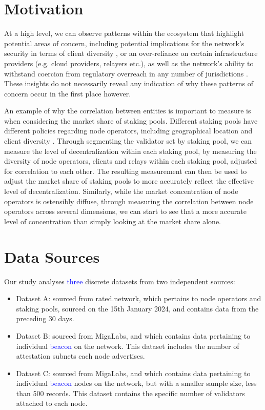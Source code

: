 \documentclass[conference]{IEEEtran}
\newcommand{\leo}[1]{\textcolor{blue}{#1}}
\begin{document}
\section{Motivation}
\label{sec:motivation}

At a high level, we can observe patterns within the ecosystem that highlight potential areas of concern, including potential implications for the network's security in terms of client diversity \cite{clientdiversity2024}, or an over-reliance on certain infrastructure providers (e.g. cloud providers, relayers etc.), as well as the network's ability to withstand coercion from regulatory overreach in any number of jurisdictions \cite{wahrstatter2023}. These insights do not necessarily reveal any indication of why these patterns of concern occur in the first place however.

An example of why the correlation between entities is important to measure is when considering the market share of staking pools. Different staking pools have different policies regarding node operators, including geographical location and client diversity \cite{vanom2024}.  Through segmenting the validator set by staking pool, we can measure the level of decentralization within each staking pool, by measuring the diversity of node operators, clients and relays within each staking pool, adjusted for correlation to each other. The resulting measurement can then be used to adjust the market share of staking pools to more accurately reflect the effective level of decentralization.  Similarly, while the market concentration of node operators is ostensibly diffuse, through measuring the correlation between node operators across several dimensions, we can start to see that a more accurate level of concentration than simply looking at the market share alone.

\section{Data Sources}
\label{sec:data}

Our study analyses \leo{three} discrete datasets from two independent sources:

\begin{itemize}
    \item Dataset A: sourced from rated.network, which pertains to node operators and staking pools, sourced on the 15th January 2024, and contains data from the preceding 30 days.
    \item Dataset B: sourced from MigaLabs, and which contains data pertaining to individual \leo{beacon} on the network.  This dataset includes the number of attestation subnets each node advertises.
    \item Dataset C: sourced from MigaLabs, and which contains data pertaining to individual \leo{beacon} nodes on the network, but with a smaller sample size, less than 500 records. This dataset contains the specific number of validators attached to each node.
\end{itemize}
\end{document}
